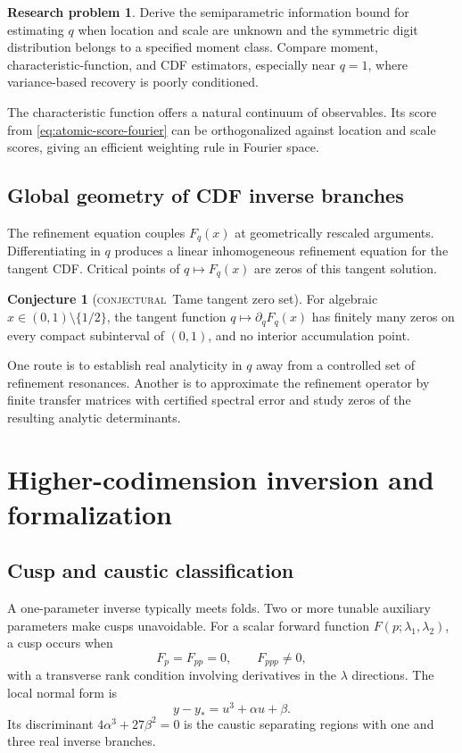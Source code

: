 \documentclass[11pt,letterpaper,oneside,openany]{book}
\theoremstyle{definition}
\newtheorem{researchproblem}[theorem]{Research problem}
\newtheorem{conjecture}[theorem]{Conjecture}
\theoremstyle{remark}
\newcommand{\statusconjectural}{\textcolor{conjectureorange}{\textsc{conjectural}}}
\begin{document}
\begin{researchproblem}
Derive the semiparametric information bound for estimating \(q\) when location
and scale are unknown and the symmetric digit distribution belongs to a
specified moment class.  Compare moment, characteristic-function, and CDF
estimators, especially near \(q=1\), where variance-based recovery is poorly
conditioned.
\end{researchproblem}
The characteristic function offers a natural continuum of observables.  Its
score from \eqref{eq:atomic-score-fourier} can be orthogonalized against
location and scale scores, giving an efficient weighting rule in Fourier
space.

\section{Global geometry of CDF inverse branches}
The refinement equation couples \(F_q(x)\) at geometrically rescaled arguments.
Differentiating in \(q\) produces a linear inhomogeneous refinement equation for
the tangent CDF.  Critical points of \(q\mapsto F_q(x)\) are zeros of this
tangent solution.

\begin{conjecture}[\statusconjectural\ Tame tangent zero set]
For algebraic \(x\in(0,1)\setminus\{1/2\}\), the tangent function
\(q\mapsto\partial_qF_q(x)\) has finitely many zeros on every compact
subinterval of \((0,1)\), and no interior accumulation point.
\end{conjecture}
One route is to establish real analyticity in \(q\) away from a controlled set
of refinement resonances.  Another is to approximate the refinement operator
by finite transfer matrices with certified spectral error and study zeros of
the resulting analytic determinants.

\chapter{Higher-codimension inversion and formalization}

\section{Cusp and caustic classification}
A one-parameter inverse typically meets folds.  Two or more tunable auxiliary
parameters make cusps unavoidable.  For a scalar forward function
\(F(p;\lambda_1,\lambda_2)\), a cusp occurs when
\[
 F_p=F_{pp}=0,
 \qquad F_{ppp}\ne0,
\]
with a transverse rank condition involving derivatives in the \(\lambda\)
directions.  The local normal form is
\[
 y-y_*=u^3+\alpha u+\beta.
\]
Its discriminant \(4\alpha^3+27\beta^2=0\) is the caustic separating regions
with one and three real inverse branches.
\end{document}

